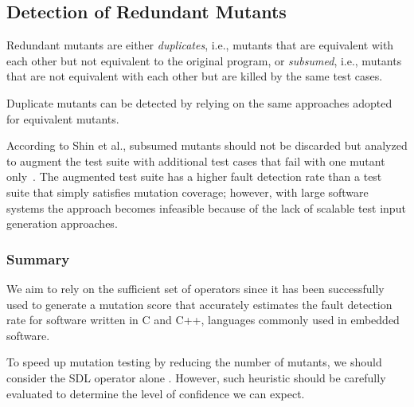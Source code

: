
\subsection{Detection of Redundant Mutants}
\label{sec:background:redundant}
Redundant mutants are either \emph{duplicates}, i.e., mutants that are equivalent with each other but not equivalent to the original program, or \emph{subsumed}, i.e., mutants that are not equivalent with each other but are killed by the same test cases. 

Duplicate mutants can be detected by relying on the same approaches adopted for equivalent mutants. 

According to Shin et al., subsumed mutants should not be discarded but analyzed to augment the test suite with additional test cases that fail with one mutant only~\cite{Shin:TSE:DCriterion:2018}. 
The augmented test suite has a higher
 fault detection rate than a test suite that simply satisfies mutation coverage; however, with large software systems the approach becomes infeasible because of the lack of scalable test input generation approaches.



\subsubsection{Summary}
\label{sec:back:summary}

We aim to rely on the sufficient set of operators since it has been successfully used to generate a mutation score that accurately estimates the fault detection rate for software written in C and C++, languages commonly used in embedded software.

To speed up mutation testing by reducing the number of mutants, we should consider the SDL operator alone . However, such heuristic should be carefully evaluated to determine the level of confidence we can expect.


